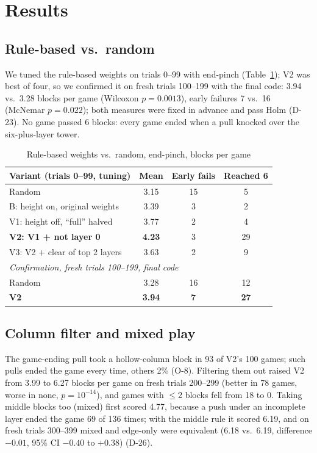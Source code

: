 \documentclass[conference]{IEEEtran}
\begin{document}
\section{Results}\label{sec:results}
\subsection{Rule-based vs.\ random}\label{sec:res-strategy}
We tuned the rule-based weights on trials 0--99 with end-pinch (Table~\ref{tab:strategy}); V2 was best of four, so we
confirmed it on fresh trials 100--199 with the final code: 3.94 vs.\ 3.28 blocks per game (Wilcoxon $p=0.0013$), early
failures 7 vs.\ 16 (McNemar $p=0.022$); both measures were fixed in advance and pass Holm (D-23). No game passed 6
blocks: every game ended when a pull knocked over the six-plus-layer tower.

\begin{table}[t]
\caption{Rule-based weights vs.\ random, end-pinch, blocks per game}\label{tab:strategy}
\centering
\begin{tabular}{lccc}
\toprule
Variant (trials 0--99, tuning) & Mean & Early fails & Reached 6 \\
\midrule
Random & 3.15 & 15 & 5 \\
B: height on, original weights & 3.39 & 3 & 2 \\
V1: height off, ``full'' halved & 3.77 & 2 & 4 \\
\textbf{V2: V1 + not layer 0} & \textbf{4.23} & 3 & 29 \\
V3: V2 + clear of top 2 layers & 3.63 & 2 & 9 \\
\midrule
\multicolumn{4}{l}{\textit{Confirmation, fresh trials 100--199, final code}} \\
Random & 3.28 & 16 & 12 \\
\textbf{V2} & \textbf{3.94} & \textbf{7} & \textbf{27} \\
\bottomrule
\end{tabular}
\end{table}

\subsection{Column filter and mixed play}
The game-ending pull took a hollow-column block in 93 of V2's 100 games; such pulls ended the game every time, others
2\% (O-8). Filtering them out raised V2 from 3.99 to 6.27 blocks per game on fresh trials 200--299 (better in 78 games,
worse in none, $p=10^{-14}$), and games with $\le$2 blocks fell from 18 to 0. Taking middle blocks too (mixed) first
scored 4.77, because a push under an incomplete layer ended the game 69 of 136 times; with the middle rule it scored
6.19, and on fresh trials 300--399 mixed and edge-only were equivalent (6.18 vs.\ 6.19, difference $-0.01$, 95\% CI
$-0.40$ to $+0.38$) (D-26).
\end{document}
